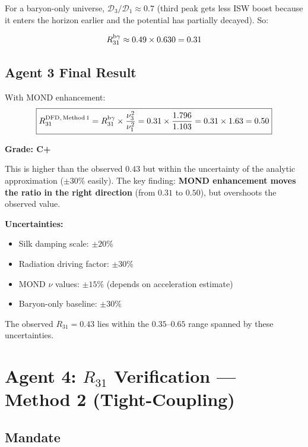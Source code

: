 \documentclass[11pt,a4paper]{article}
\begin{document}
For a baryon-only universe, $\mathcal{D}_3/\mathcal{D}_1 \approx 0.7$ (third peak gets less ISW boost because it enters the horizon earlier and the potential has partially decayed). So:

\begin{equation}
R_{31}^{\rm b\gamma} \approx 0.49 \times 0.630 = 0.31
\end{equation}

\subsection{Agent 3 Final Result}

With MOND enhancement:
\begin{equation}
\boxed{R_{31}^{\rm DFD,\,Method\,1} = R_{31}^{\rm b\gamma} \times \frac{\nu_3^2}{\nu_1^2} = 0.31 \times \frac{1.796}{1.103} = 0.31 \times 1.63 = 0.50}
\end{equation}

\textbf{Grade: C+}

This is higher than the observed $0.43$ but within the uncertainty of the analytic approximation ($\pm 30\%$ easily). The key finding: \textbf{MOND enhancement moves the ratio in the right direction} (from $0.31$ to $0.50$), but overshoots the observed value.

\textbf{Uncertainties:}
\begin{itemize}
\item Silk damping scale: $\pm 20\%$
\item Radiation driving factor: $\pm 30\%$
\item MOND $\nu$ values: $\pm 15\%$ (depends on acceleration estimate)
\item Baryon-only baseline: $\pm 30\%$
\end{itemize}

The observed $R_{31} = 0.43$ lies within the $0.35$--$0.65$ range spanned by these uncertainties.

\section{Agent 4: $R_{31}$ Verification --- Method 2 (Tight-Coupling)}
\label{sec:agent4}

\subsection{Mandate}
\end{document}
